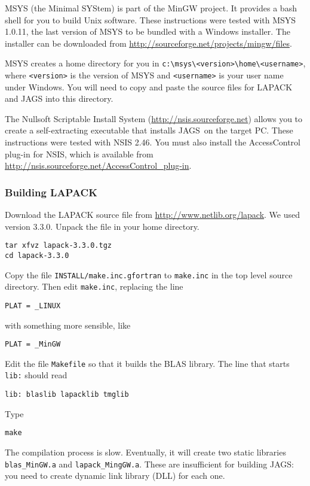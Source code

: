 \documentclass[11pt, a4paper, titlepage]{article}
\newcommand{\JAGS}{\textsf{JAGS}}
\begin{document}
MSYS (the Minimal SYStem) is part of the MinGW project. It provides a
bash shell for you to build Unix software. These instructions were
tested with MSYS 1.0.11, the last version of MSYS to be bundled with a
Windows installer.  The installer can be downloaded from
\url{http://sourceforge.net/projects/mingw/files}.  

MSYS creates a home directory for you in
\verb+c:\msys\<version>\home\<username>+, where \texttt{<version>} is
the version of MSYS and \texttt{<username>} is your user name under
Windows. You will need to copy and paste the source files for LAPACK
and JAGS into this directory.

The Nullsoft Scriptable Install System
(\url{http://nsis.sourceforge.net}) allows you to create a
self-extracting executable that installs \JAGS\ on the target PC.
These instructions were tested with NSIS 2.46.  You must also install
the AccessControl plug-in for NSIS, which is available from
\url{http://nsis.sourceforge.net/AccessControl_plug-in}.

\subsubsection{Building LAPACK}

Download the LAPACK source file from
\url{http://www.netlib.org/lapack}. We used version 3.3.0.  Unpack the
file in your home directory.
\begin{verbatim}
tar xfvz lapack-3.3.0.tgz
cd lapack-3.3.0
\end{verbatim}
Copy the file \texttt{INSTALL/make.inc.gfortran} to \texttt{make.inc} in
the top level source directory.  Then edit \texttt{make.inc},
replacing the line
\begin{verbatim}
PLAT = _LINUX
\end{verbatim}
with something more sensible, like
\begin{verbatim}
PLAT = _MinGW
\end{verbatim} 

Edit the file \texttt{Makefile} so that it builds the BLAS library. The
line that starts \texttt{lib:} should read
\begin{verbatim}
lib: blaslib lapacklib tmglib
\end{verbatim}
Type
\begin{verbatim}
make 
\end{verbatim}
The compilation process is slow. Eventually, it will create two static
libraries \verb+blas_MinGW.a+ and \verb+lapack_MingGW.a+. These are
insufficient for building \JAGS: you need to create dynamic link
library (DLL) for each one.
\end{document}
